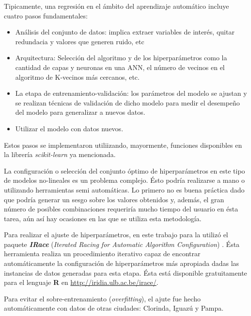     \par Tipicamente, una regresión en el ámbito del aprendizaje automático
      incluye cuatro pasos fundamentales:
      \begin{itemize}
        \item Análisis del conjunto de datos: implica extraer variables de interés, quitar redundacia y valores que generen
              ruido, etc
        \item Arquitectura: Selección del algoritmo y de los hiperparámetros como
              la cantidad de capas y neuronas en una ANN, el número de vecinos en
              el algoritmo de K-vecinos más cercanos, etc.
        \item La etapa de entrenamiento-validación: los parámetros del modelo
              se ajustan y se realizan técnicas de validación de dicho modelo para
              medir el desempeño del modelo para generalizar a nuevos datos.
        \item Utilizar el modelo con datos nuevos.
      \end{itemize}
      Estos pasos se implementaron utiliizando, mayormente, funciones disponibles
      en la librería \textit{scikit-learn} ya mencionada.

    \par La configuración o selección del conjunto óptimo de hiperparámetros
      en este tipo de modelos no-lineales es un problema complejo. Ésto
      podría realizarse a mano o utilizando herramientas semi automáticas. Lo primero
      no es buena práctica dado que podría generar un sesgo sobre los valores
      obtenidos y, además, el gran número de posibles combinaciones requeriría
      mucho tiempo del usuario en ésta tarea, aún así hay ocasiones en las
      que se utiliza esta metodología.

    \par Para realizar el ajuste de hiperparámetros, en este trabajo para la
      utilizó el paquete \textbf{\textit{IRace}}
      (\textit{Iterated Racing for Automatic Algorithm Configuration}) \cite{irace}.
      Ésta herramienta realiza un procedimiento iterativo capaz de encontrar
      automáticamente la configuración de hiperparámetros más apropiada
      dadas las instancias de datos generadas para esta etapa.
      Ésta está disponible gratuitamente para el lenguaje \textbf{R} en
      \url{http://iridia.ulb.ac.be/irace/}.

    \par Para evitar el sobre-entrenamiento (\textit{overfitting}), el ajute
      fue hecho automáticamente con datos de otras ciudades: Clorinda, Iguazú
      y Pampa.


